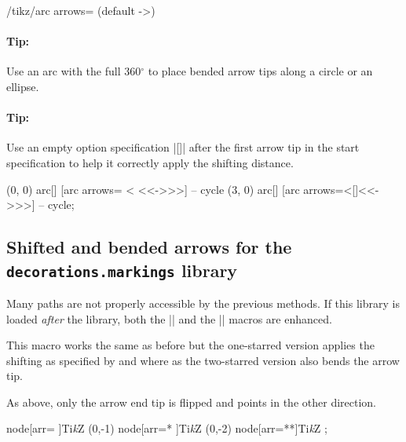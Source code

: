 \begin{multicols}{2}
\begin{key}{/tikz/arc arrows= (default ->)}
\paragraph{Tip:}
Use an arc with the full 360${}^\circ$ to place bended arrow tips along a circle or an ellipse.
\paragraph{Tip:}
Use an empty option specification |[]| after the first arrow tip in the start specification
to help it correctly apply the shifting distance.
\begin{codeexample}[preamble=\usetikzlibrary{bending, ext.arrows-plus}]
\tikz[>={Stealth[color=red, round]}, arrows={[bend]}, ultra thick]
  \draw[start angle=0, end angle=360, radius=1,
        every arc arrows/.style={pos <=.25, pos >=.75}]
    (0, 0) arc[] [arc arrows= <  <<->>>]  -- cycle
    (3, 0) arc[] [arc arrows={<[]<<->>>}] -- cycle;
\end{codeexample}
\end{key}
\subsection{Shifted and bended arrows for the \texttt{decorations.markings} library}
Many paths are not properly accessible by the previous methods.
If this library is loaded \emph{after}
the  library,
both the |\arrow| and the |\arrowreversed| macros are enhanced.

\begin{command}{\arrow{}}
  This macro works the same as before but the one-starred version
  applies the shifting as specified
  by  and 
  where as the two-starred version also bends the arrow tip.
\end{command}
\begin{command}{\arrowreversed{}}
  As above, only the arrow end tip is flipped and points in the other direction.
\end{command}
\begin{codeexample}[width=2cm,preamble=\usetikzlibrary{bending, decorations.markings, ext.arrows-plus}]
\tikz[y=1.5cm, >=Stealth, arrows={[round]}, nodes={circle, draw}]
  \path   node[arr=  ]{Ti\emph kZ} %
   (0,-1) node[arr=* ]{Ti\emph kZ} %
   (0,-2) node[arr=**]{Ti\emph kZ} %
  ;
\end{codeexample}
\end{multicols}
\endinput